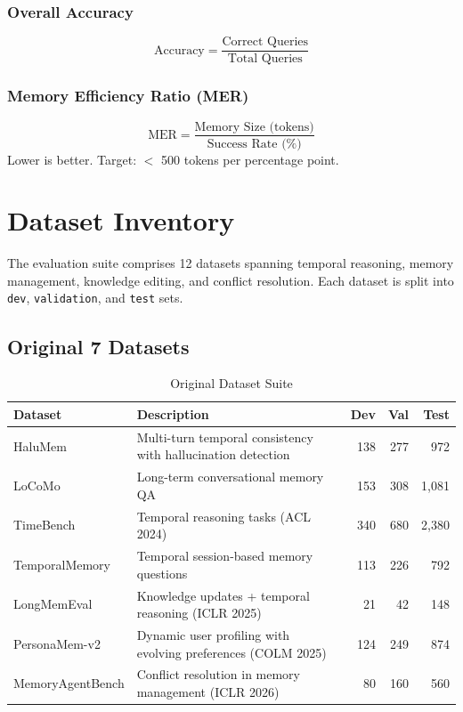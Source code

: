 \documentclass[11pt,a4paper]{article}
\begin{document}
\subsubsection{Overall Accuracy}
\[
\text{Accuracy} = \frac{\text{Correct Queries}}{\text{Total Queries}}
\]

\subsubsection{Memory Efficiency Ratio (MER)}
\[
\text{MER} = \frac{\text{Memory Size (tokens)}}{\text{Success Rate (\%)}}
\]
Lower is better. Target: $<$ 500 tokens per percentage point.

\section{Dataset Inventory}

The evaluation suite comprises 12 datasets spanning temporal reasoning, memory management, knowledge editing, and conflict resolution. Each dataset is split into \texttt{dev}, \texttt{validation}, and \texttt{test} sets.

\subsection{Original 7 Datasets}

\begin{table}[H]
\centering
\caption{Original Dataset Suite}
\small
\begin{tabular}{@{}lp{5cm}rrr@{}}
\toprule
\textbf{Dataset} & \textbf{Description} & \textbf{Dev} & \textbf{Val} & \textbf{Test} \\
\midrule
HaluMem & Multi-turn temporal consistency with hallucination detection & 138 & 277 & 972 \\
LoCoMo & Long-term conversational memory QA & 153 & 308 & 1,081 \\
TimeBench & Temporal reasoning tasks (ACL 2024) & 340 & 680 & 2,380 \\
TemporalMemory & Temporal session-based memory questions & 113 & 226 & 792 \\
LongMemEval & Knowledge updates + temporal reasoning (ICLR 2025) & 21 & 42 & 148 \\
PersonaMem-v2 & Dynamic user profiling with evolving preferences (COLM 2025) & 124 & 249 & 874 \\
MemoryAgentBench & Conflict resolution in memory management (ICLR 2026) & 80 & 160 & 560 \\
\bottomrule
\end{tabular}
\end{table}
\end{document}
